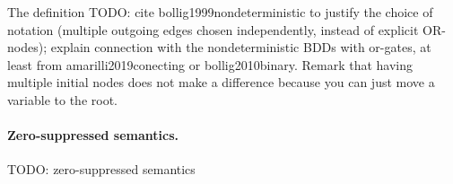 The definition 
TODO: cite bollig1999nondeterministic to justify the choice of notation (multiple outgoing edges chosen independently, instead of explicit OR-nodes); explain connection with the nondeterministic BDDs with or-gates, at least from amarilli2019conecting or bollig2010binary. Remark that having multiple initial nodes does not make a difference because you can just move a variable to the root.

\paragraph*{Zero-suppressed semantics.}
TODO: zero-suppressed semantics

